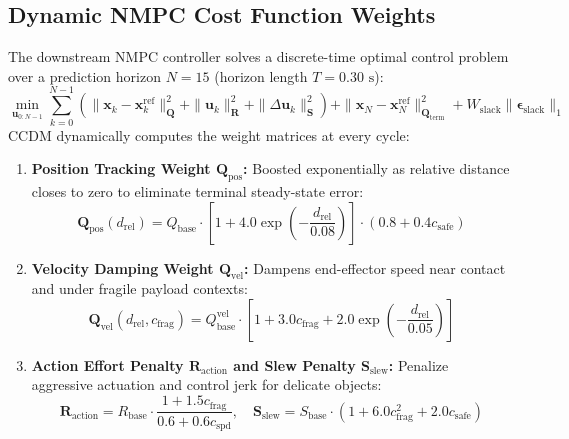 \documentclass[10pt,a4paper]{article}
\begin{document}
\subsection{Dynamic NMPC Cost Function Weights}
The downstream NMPC controller solves a discrete-time optimal control problem over a prediction horizon $N = 15$ (horizon length $T = 0.30\text{ s}$):
\begin{equation}
\min_{\mathbf{u}_{0:N-1}} \sum_{k=0}^{N-1} \left( \|\mathbf{x}_k - \mathbf{x}_k^{\mathrm{ref}}\|_{\mathbf{Q}}^2 + \|\mathbf{u}_k\|_{\mathbf{R}}^2 + \|\Delta \mathbf{u}_k\|_{\mathbf{S}}^2 \right) + \|\mathbf{x}_N - \mathbf{x}_N^{\mathrm{ref}}\|_{\mathbf{Q}_{\mathrm{term}}}^2 + W_{\mathrm{slack}} \|\bm{\epsilon}_{\mathrm{slack}}\|_1
\label{eq:nmpc_opt}
\end{equation}
CCDM dynamically computes the weight matrices at every cycle:
\begin{enumerate}
    \item \textbf{Position Tracking Weight $\mathbf{Q}_{\mathrm{pos}}$:} Boosted exponentially as relative distance closes to zero to eliminate terminal steady-state error:
    \begin{equation}
    \mathbf{Q}_{\mathrm{pos}}(d_{\mathrm{rel}}) = Q_{\mathrm{base}} \cdot \left[1 + 4.0 \exp\left(-\frac{d_{\mathrm{rel}}}{0.08}\right)\right] \cdot \left(0.8 + 0.4 c_{\mathrm{safe}}\right)
    \label{eq:q_pos}
    \end{equation}
    \item \textbf{Velocity Damping Weight $\mathbf{Q}_{\mathrm{vel}}$:} Dampens end-effector speed near contact and under fragile payload contexts:
    \begin{equation}
    \mathbf{Q}_{\mathrm{vel}}(d_{\mathrm{rel}}, c_{\mathrm{frag}}) = Q_{\mathrm{base}}^{\mathrm{vel}} \cdot \left[1 + 3.0 c_{\mathrm{frag}} + 2.0 \exp\left(-\frac{d_{\mathrm{rel}}}{0.05}\right)\right]
    \label{eq:q_vel}
    \end{equation}
    \item \textbf{Action Effort Penalty $\mathbf{R}_{\mathrm{action}}$ and Slew Penalty $\mathbf{S}_{\mathrm{slew}}$:} Penalize aggressive actuation and control jerk for delicate objects:
    \begin{equation}
    \mathbf{R}_{\mathrm{action}} = R_{\mathrm{base}} \cdot \frac{1 + 1.5 c_{\mathrm{frag}}}{0.6 + 0.6 c_{\mathrm{spd}}}, \quad \mathbf{S}_{\mathrm{slew}} = S_{\mathrm{base}} \cdot \left(1 + 6.0 c_{\mathrm{frag}}^2 + 2.0 c_{\mathrm{safe}}\right)
    \label{eq:r_s}
    \end{equation}
\end{enumerate}
\end{document}

